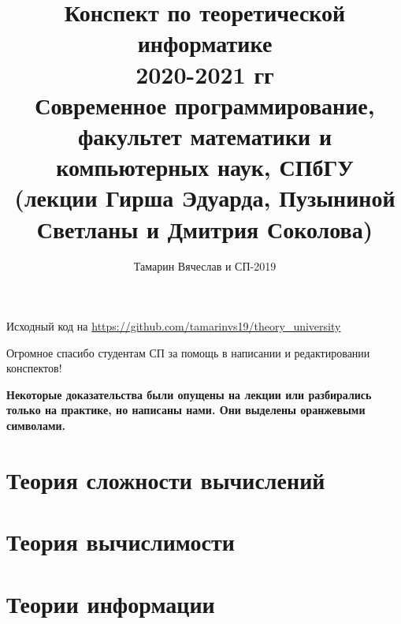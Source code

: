 \documentclass[11pt]{report}
\title{Конспект по теоретической информатике\\2020-2021 гг\\
    Современное программирование, факультет математики и компьютерных наук, СПбГУ\\
(лекции Гирша Эдуарда, Пузыниной Светланы и Дмитрия Соколова)}
\author{Тамарин Вячеслав и СП-2019}
\begin{document}
\maketitle
\tableofcontents
\hspace{1em}
\begin{center}
	Исходный код на \url{https://github.com/tamarinvs19/theory_university}
\end{center}
\hspace{1em}
\begin{center}
    Огромное спасибо студентам СП за помощь в написании и редактировании конспектов!
\end{center}
\hspace{1em}
\begin{center}
	\begin{proof*}
	\textbf{
    Некоторые доказательства были опущены на лекции или разбирались только на практике, но написаны нами. Они выделены оранжевыми символами.
}
	\end{proof*}
\end{center}

\printindex

\part{Теория сложности вычислений}
 
 
 
 
 
 
 
\setcounter{chapter}{0}
\part{Теория вычислимости}
 
 
 
 
 
 
 
\setcounter{chapter}{0}
\part{Теории информации}
 
 
 
 
 
 
 

\
\end{document}
